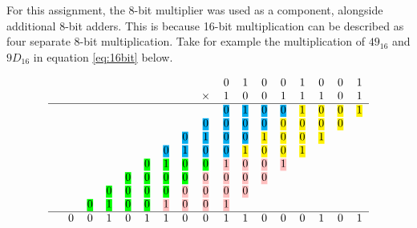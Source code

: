 \documentclass[11pt]{article}
\newcommand{\hlc}[2][yellow]{{%
    \colorlet{foo}{#1}%
    \sethlcolor{foo}\hl{#2}}%
}
\begin{document}
For this assignment, the 8-bit multiplier was used as a component, alongside additional 8-bit adders. 
This is because 16-bit multiplication can be described as four separate 8-bit multiplication.
Take for example the multiplication of $49_16$ and $9D_16$ in equation \ref{eq:16bit} below.

\begin{equation}
    \label{eq:16bit}
    \begin{tabular}{c c c c c c c c c c c c c c c c c c}
        &   &   &   &   &  &  &  &   & 0 & 1 & 0 & 0 & 1 & 0 & 0 & 1\\
        &   &   &   & &&&&$\times$   & 1 & 0 & 0 & 1 & 1 & 1 & 0 & 1 \\
                \hline
        &   &   &   &   &   &   &   &   & \hlc[cyan]{0} & \hlc[cyan]{1} & \hlc[cyan]{0} & \hlc[cyan]{0} & \hlc[yellow]{1} & \hlc[yellow]{0} & \hlc[yellow]{0} & \hlc[yellow]{1} \\
        &   &   &   &   &   &   &   & \hlc[cyan]{0} & \hlc[cyan]{0} & \hlc[cyan]{0} & \hlc[cyan]{0} & \hlc[yellow]{0} & \hlc[yellow]{0} & \hlc[yellow]{0} & \hlc[yellow]{0} &   \\
        &   &   &   &   &   &   & \hlc[cyan]{0} & \hlc[cyan]{1} & \hlc[cyan]{0} & \hlc[cyan]{0} & \hlc[yellow]{1} & \hlc[yellow]{0} & \hlc[yellow]{0} & \hlc[yellow]{1} &   &   \\
        &   &   &   &   &   & \hlc[cyan]{0} & \hlc[cyan]{1} & \hlc[cyan]{0} & \hlc[cyan]{0} & \hlc[yellow]{1} & \hlc[yellow]{0} & \hlc[yellow]{0} & \hlc[yellow]{1} &   &   &   \\
        &   &   &   &   & \hlc[green]{0} & \hlc[green]{1} & \hlc[green]{0} & \hlc[green]{0} & \hlc[pink]{1} & \hlc[pink]{0} & \hlc[pink]{0} & \hlc[pink]{1} &   &   &   &   \\
        &   &   &   & \hlc[green]{0} & \hlc[green]{0} & \hlc[green]{0} & \hlc[green]{0} & \hlc[pink]{0} & \hlc[pink]{0} & \hlc[pink]{0} & \hlc[pink]{0} &   &   &   &   &   \\
        &   &   & \hlc[green]{0} & \hlc[green]{0} & \hlc[green]{0} & \hlc[green]{0} & \hlc[pink]{0} & \hlc[pink]{0} & \hlc[pink]{0} & \hlc[pink]{0} &   &   &   &   &   &   \\
        &   & \hlc[green]{0} & \hlc[green]{1} & \hlc[green]{0} & \hlc[green]{0} & \hlc[pink]{1} & \hlc[pink]{0} & \hlc[pink]{0} & \hlc[pink]{1} &   &   &   &   &   &   &   \\
                \hline
        & 0 & 0 & 1 & 0 & 1 & 1 & 0 & 0 & 1 & 1 & 0 & 0 & 0 & 1 & 0 & 1 \\
    \end{tabular} 
\end{equation}
\end{document}
